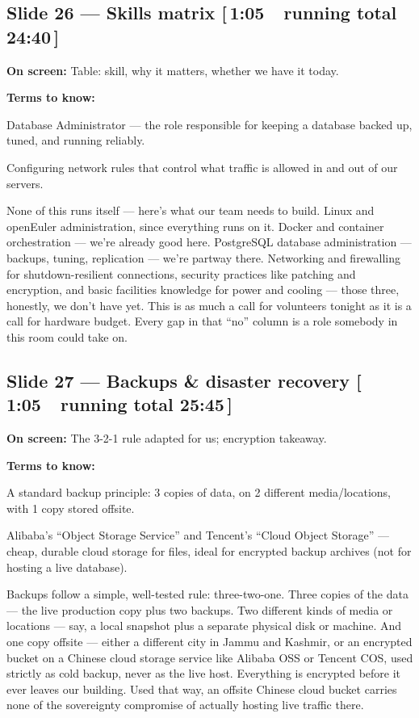 \documentclass[11pt]{article}
\newcommand{\onscreen}[1]{\noindent\textbf{\color{sovGrey}On screen:} #1\par\vspace{4pt}}
\newcommand{\timing}[2]{\hfill{\normalsize\color{sovGrey}[\,#1\ \textbar\ running total #2\,]}}
\newenvironment{terms}
  {\noindent\textbf{\color{sovGrey}Terms to know:}
   \begin{description}[leftmargin=0pt,style=sameline,labelindent=0pt,itemsep=2pt,topsep=2pt,font=\normalfont\bfseries\color{sovDark}]}
  {\end{description}\vspace{2pt}}
\begin{document}
\subsection*{Slide 26 --- Skills matrix \timing{1:05}{24:40}}
\onscreen{Table: skill, why it matters, whether we have it today.}
\begin{terms}
  \item[DBA] Database Administrator --- the role responsible for keeping a database
    backed up, tuned, and running reliably.
  \item[Firewalling] Configuring network rules that control what traffic is allowed
    in and out of our servers.
\end{terms}
\begin{sayit}
None of this runs itself --- here's what our team needs to build. Linux and openEuler
administration, since everything runs on it. Docker and container orchestration ---
we're already good here. PostgreSQL database administration --- backups, tuning,
replication --- we're partway there. Networking and firewalling for shutdown-resilient
connections, security practices like patching and encryption, and basic facilities
knowledge for power and cooling --- those three, honestly, we don't have yet. This is as
much a call for volunteers tonight as it is a call for hardware budget. Every gap in
that ``no'' column is a role somebody in this room could take on.
\end{sayit}

\subsection*{Slide 27 --- Backups \& disaster recovery \timing{1:05}{25:45}}
\onscreen{The 3-2-1 rule adapted for us; encryption takeaway.}
\begin{terms}
  \item[3-2-1 rule] A standard backup principle: 3 copies of data, on 2 different
    media/locations, with 1 copy stored offsite.
  \item[OSS / COS] Alibaba's ``Object Storage Service'' and Tencent's ``Cloud Object
    Storage'' --- cheap, durable cloud storage for files, ideal for encrypted backup
    archives (not for hosting a live database).
\end{terms}
\begin{sayit}
Backups follow a simple, well-tested rule: three-two-one. Three copies of the data ---
the live production copy plus two backups. Two different kinds of media or locations
--- say, a local snapshot plus a separate physical disk or machine. And one copy offsite
--- either a different city in Jammu and Kashmir, or an encrypted bucket on a Chinese
cloud storage service like Alibaba OSS or Tencent COS, used strictly as cold backup,
never as the live host. Everything is encrypted before it ever leaves our building. Used
that way, an offsite Chinese cloud bucket carries none of the sovereignty compromise of
actually hosting live traffic there.
\end{sayit}
\end{document}
